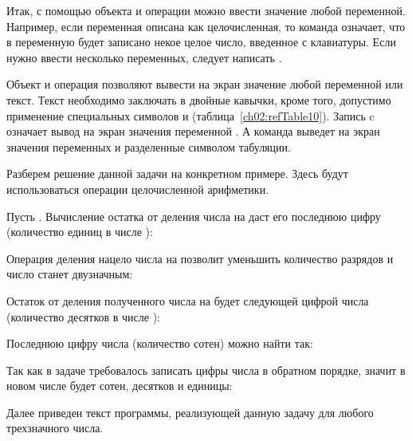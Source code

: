 Итак, с помощью объекта  и операции \Sys{{\textgreater}{\textgreater}} можно ввести
значение любой переменной. Например, если переменная  описана как целочисленная, то команда
означает, что в переменную  будет записано
некое целое число, введенное с клавиатуры. Если нужно ввести несколько переменных, следует написать
.

Объект  и операция \Sys{{\textless}{\textless}} позволяют вывести на экран значение
любой переменной или текст. Текст необходимо заключать в двойные кавычки, кроме того, допустимо применение специальных
символов  и  (таблица~\ref{ch02:refTable10}).
Запись c означает вывод на экран значения переменной
. А команда
 выведет
на экран значения переменных  и  разделенные символом табуляции.


Разберем решение данной задачи на конкретном примере. Здесь будут использоваться операции целочисленной арифметики. 

Пусть . Вычисление остатка от деления числа  на  даст
его последнюю цифру (количество единиц в числе ):

Операция деления нацело числа  на  позволит уменьшить количество разрядов и
число станет двузначным:


Остаток от деления полученного числа на  будет следующей цифрой числа 
(количество десятков в числе ):


Последнюю цифру числа  (количество сотен) можно найти так:


Так как в задаче требовалось записать цифры числа  в обратном порядке, значит в новом числе будет
 сотен,  десятков и  единицы:


Далее приведен текст программы, реализующей данную задачу для любого трехзначного числа.

